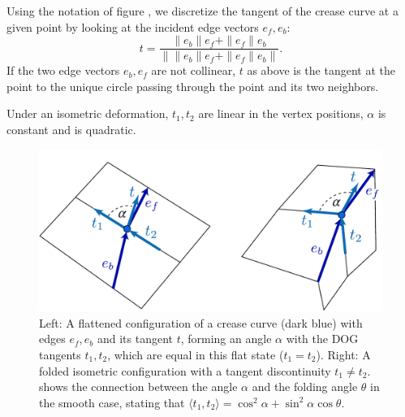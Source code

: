 Using the notation of figure , we discretize the tangent of the crease curve at a given point by looking at the incident edge vectors $e_f, e_b$: 
\begin{equation} \label{eq:crease_tangent}
t = \frac{\|e_b\|e_f + \|e_f\|e_b}{\left\|\|e_b\|e_f + \|e_f\|e_b\right\|}.
\end{equation}
If the two edge vectors $e_b, e_f$ are not collinear, $t$ as above is the tangent at the point to the unique circle passing through the point and its two neighbors. 

Under an isometric deformation, $t_1,t_2$ are linear in the vertex positions, $\alpha$ is constant and   is quadratic.

\begin{figure} [h]
	\centering
	\includegraphics[width=0.8\linewidth]{figures/fold_angle_and_tangent_angles}
	\caption{Left: A flattened configuration of a crease curve (dark blue) with edges $e_f,e_b$ and its tangent $t$, forming an angle $\alpha$ with the DOG tangents $t_1,t_2$, which are equal in this flat state ($t_1=t_2$). Right: A folded isometric configuration with a tangent discontinuity  $t_1 \neq t_2$.  shows the connection between the angle $\alpha$ and the folding angle $\theta$ in the smooth case, stating that $\langle t_1, t_2 \rangle = \cos^2\!\alpha + \sin^2\!\alpha \cos\theta$.}
	\label{fig:fold_angle_and_tangent_angles}
\end{figure}

